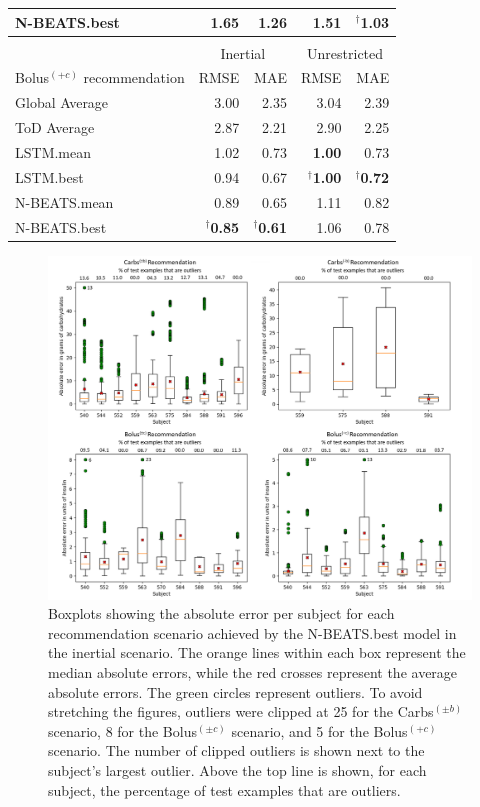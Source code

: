 \documentclass[journal,article,submit,moreauthors,pdftex]{Definitions/mdpi}
\begin{document}
\begin{table}[t]
\begin{center}
\begin{tabular}{|l|rr|rr|}
	N-BEATS.best & 1.65 & 1.26 & 1.51 & $^\dagger${\bf 1.03}\\
	\hline
	\multicolumn{5}{c}{}\\[-1.5ex]
	\cline{2-5}
	\multicolumn{1}{c}{} & \multicolumn{2}{|c|}{Inertial} & \multicolumn{2}{c|}{Unrestricted}\\
	\hline
	Bolus$^{(+c)}$ recommendation & RMSE & MAE & RMSE & MAE\\
	\hline
	Global Average & 3.00 & 2.35 & 3.04 & 2.39\\
	ToD Average & 2.87 & 2.21 & 2.90 & 2.25\\
	\hline
	LSTM.mean & 1.02 & 0.73 & {\bf 1.00} & 0.73\\
	LSTM.best & 0.94 & 0.67 & $^\dagger${\bf 1.00} & $^\dagger${\bf 0.72}\\
	\hline
	N-BEATS.mean & 0.89 & 0.65 & 1.11 & 0.82\\
	N-BEATS.best & $^\dagger${\bf 0.85} & $^\dagger${\bf 0.61} & 1.06 & 0.78\\
	\hline
\end{tabular}
\end{center}
\end{table}

\begin{figure}[t]
    \includegraphics[width=\textwidth]{boxplot_figure}
    \caption{Boxplots showing the absolute error per subject for each recommendation scenario achieved by the N-BEATS.best model in the inertial scenario. The orange lines within each box represent the median absolute errors, while the red crosses represent the average absolute errors. The green circles represent outliers. To avoid stretching the figures, outliers were clipped at 25 for the Carbs$^{(\pm b)}$ scenario, 8 for the Bolus$^{(\pm c)}$ scenario, and 5 for the Bolus$^{(+c)}$ scenario. The number of clipped outliers is shown next to the subject's largest outlier. Above the top line is shown, for each subject, the percentage of test examples that are outliers.}
    \label{fig:boxplots}
\end{figure}
\end{document}
